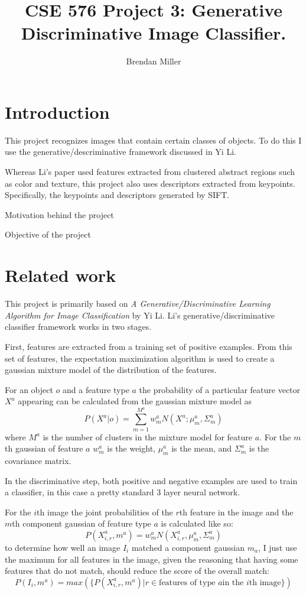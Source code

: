 \documentclass[11pt]{article}
\title{CSE 576 Project 3: Generative Discriminative Image Classifier.}
\author{Brendan Miller}
\begin{document}
\maketitle
\section{Introduction}

This project recognizes images that contain certain classes of
objects. To do this I use the generative/descriminative framework
discussed in Yi Li\cite{gendesc}.

Whereas Li's paper used features extracted from clustered abstract
regions such as color and texture, this project also uses descriptors
extracted from keypoints. Specifically, the keypoints and descriptors
generated by SIFT.

Motivation behind the project

Objective of the project

\section{Related work}

This project is primarily based on \emph{A Generative/Discriminative
  Learning Algorithm for Image Classification} by Yi
Li\cite{gendesc}. Li's generative/discriminative classifier framework
works in two stages.

First, features are extracted from a training set of positive
examples. From this set of features, the expectation maximization
algorithm is used to create a gaussian mixture model of the
distribution of the features.

For an object $o$ and a feature type $a$ the probability of a
particular feature vector $X^a$ appearing can be calculated from the
gaussian mixture model as
\begin{equation*}
  P(X^a|o) = \sum_{m=1}^{M^a} w^a_m N(X^a; \mu^a_m, \Sigma^a_m)
\end{equation*}
where $M^a$ is the number of clusters in the mixture model for feature
$a$. For the $m$th gaussian of feature $a$ $w^a_m$ is the weight,
$\mu^a_m$ is the mean, and $\Sigma^a_m$ is the covariance matrix.

In the discriminative step, both positive and negative examples are
used to train a classifier, in this case a pretty standard 3 layer
neural network.

For the $i$th image the joint probabilities of the $r$th feature
in the image and the $m$th component gaussian of feature type $a$ is
calculated like so:
\begin{equation*}
  P(X^a_{i,r},m^a) = w^a_m N(X^a_{i,r}, \mu^a_m, \Sigma^a_m)
\end{equation*}
to determine how well an image $I_i$ matched a component gaussian $m_a$, I just
use the maximum for all features in the image, given the reasoning
that having some features that do not match, should reduce the score
of the overall match:
\begin{equation*}
P(I_i, m^a) = max(\{P(X^a_{i,r}, m^a)|r \in \mbox{features of type $a$
  in the $i$th image\}})
\end{equation*}
\end{document}
